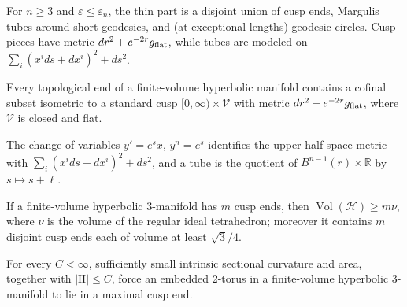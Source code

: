 \begin{theorem}
\label{thm:chow-iv-thin-part-structure}
For \(n\ge3\) and \(\varepsilon\le\varepsilon_n\), the thin part is a disjoint
union of cusp ends, Margulis tubes around short geodesics, and (at exceptional
lengths) geodesic circles.  Cusp pieces have metric
\(dr^2+e^{-2r}g_{\rm flat}\), while tubes are modeled on
\(\sum_i(x^i ds+dx^i)^2+ds^2\).
\end{theorem}

\begin{theorem}
\label{thm:chow-iv-finite-volume-ends-cusps}
Every topological end of a finite-volume hyperbolic manifold contains a
cofinal subset isometric to a standard cusp
\([0,\infty)\times\mathcal V\) with metric
\(dr^2+e^{-2r}g_{\rm flat}\), where \(\mathcal V\) is closed and flat.
\end{theorem}

\begin{example}
\label{ex:chow-iv-margulis-tube-quotient}
The change of variables \(y'=e^s x\), \(y^n=e^s\) identifies the upper
half-space metric with \(\sum_i(x^i ds+dx^i)^2+ds^2\), and a tube is the quotient
of \(B^{n-1}(r)\times\mathbb R\) by \(s\mapsto s+\ell\).
\end{example}

\begin{theorem}
\label{thm:chow-iv-cusp-volume-bound}
If a finite-volume hyperbolic 3-manifold has \(m\) cusp ends, then
\(\operatorname{Vol}(\mathcal H)\ge m\nu\), where \(\nu\) is the volume of the
regular ideal tetrahedron; moreover it contains \(m\) disjoint cusp ends each
of volume at least \(\sqrt3/4\).
\end{theorem}

\begin{corollary}
\label{cor:chow-iv-small-almost-flat-tori}
For every \(C<\infty\), sufficiently small intrinsic sectional curvature and
area, together with \(|\mathrm{II}|\le C\), force an embedded 2-torus in a
finite-volume hyperbolic 3-manifold to lie in a maximal cusp end.
\end{corollary}

